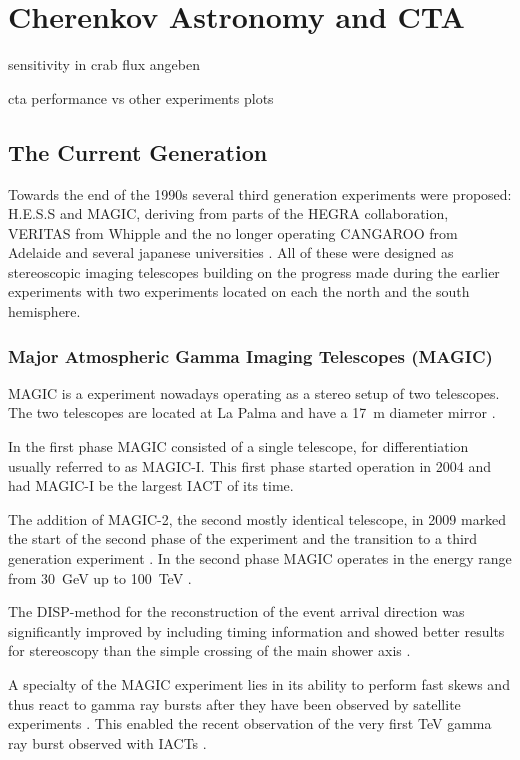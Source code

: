 \chapter{Cherenkov Astronomy and CTA}
\label{cta}

sensitivity in crab flux angeben

cta performance vs other experiments plots
\section{The Current Generation}

Towards the end of the 1990s several third generation experiments were
proposed:
H.E.S.S and MAGIC, deriving from parts of the HEGRA collaboration, 
VERITAS from Whipple and the no longer operating CANGAROO from Adelaide and 
several japanese universities \cite{HILLAS201319}. All of these
were designed as stereoscopic imaging telescopes building on the progress made during the 
earlier experiments with two experiments located on each the north and the south hemisphere.

\subsection{Major Atmospheric Gamma Imaging Telescopes (MAGIC)}
MAGIC is a experiment nowadays operating as a stereo setup of two telescopes.
The two telescopes are located at La Palma and have a \SI{17}{\meter} diameter mirror \cite{ALEKSIC201676}.

In the first phase MAGIC consisted of a single telescope, for differentiation usually
referred to as MAGIC-I. This first phase started 
operation in 2004 and had MAGIC-I be the largest IACT of its time.

The addition of MAGIC-2, the second mostly identical telescope, in 2009 marked the 
start of the second phase of the experiment and the transition to a third 
generation experiment \cite{2009arXiv0907.1211C}.
In the second phase MAGIC operates in the energy range from \SI{30}{\giga\eV}
up to \SI{100}{\TeV} \cite{magic_website}.

The DISP-method for the reconstruction of the event arrival direction 
was significantly improved by including timing information and showed better 
results for stereoscopy than the simple crossing of the main shower axis \cite{ALEKSIC2012435}.

A specialty of the MAGIC experiment lies in its ability to 
perform fast skews and thus react to gamma ray bursts after they have been observed 
by satellite experiments \cite{2003ICRC....5.2943B}.
This enabled the recent observation of the very first \si{\TeV}
gamma ray burst observed with IACTs \cite{collaboration2019teraelectronvolt}.


